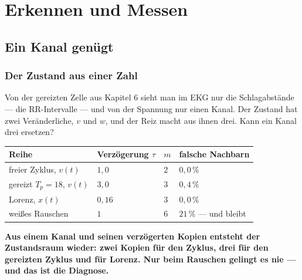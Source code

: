 \part{Erkennen und Messen}

\chapter{Ein Kanal genügt}

\section{Der Zustand aus einer Zahl}

\begin{merksatz}
Von der gereizten Zelle aus Kapitel 6 sieht man im EKG nur die Schlagabstände --- die RR-Intervalle --- und von der Spannung nur einen Kanal. Der Zustand hat zwei Veränderliche, $v$ und $w$, und der Reiz macht aus ihnen drei. Kann ein Kanal drei ersetzen?

\begin{center}
{\small
\renewcommand{\arraystretch}{1.46}
\begin{tabular}{@{}P{2.6cm}P{2.0cm}P{1.0cm}P{3.0cm}@{}}
\toprule
\textbf{Reihe} & \textbf{Verzögerung $\tau$} & $m$ & \textbf{falsche Nachbarn}\\
\midrule
freier Zyklus, $v(t)$ & $1{,}0$ & $2$ & $0{,}0\,\%$\\
gereizt $T_p = 18$, $v(t)$ & $3{,}0$ & $3$ & $0{,}4\,\%$\\
Lorenz, $x(t)$ & $0{,}16$ & $3$ & $0{,}0\,\%$\\
weißes Rauschen & $1$ & $6$ & $21\,\%$ --- und bleibt\\
\bottomrule
\end{tabular}}
\end{center}

\begin{center}
\begin{minipage}{0.9\textwidth}
\textbf{Aus einem Kanal und seinen verzögerten Kopien entsteht der Zustandsraum wieder: zwei Kopien für den Zyklus, drei für den gereizten Zyklus und für Lorenz. Nur beim Rauschen gelingt es nie --- und das ist die Diagnose.}
\end{minipage}
\end{center}

\begin{center}
\begin{minipage}{0.88\textwidth}
\end{minipage}
\end{center}
\end{merksatz}

